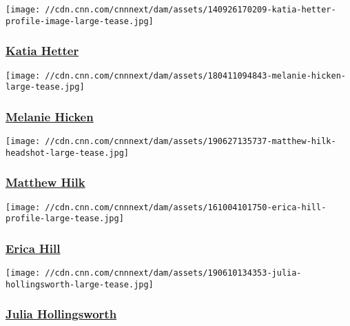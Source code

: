 \href{/profiles/katia-hetter}{}

\texttt{[image: //cdn.cnn.com/cnnnext/dam/assets/140926170209-katia-hetter-profile-image-large-tease.jpg]}

\hypertarget{katia-hetter}{%
\subsubsection{\texorpdfstring{\href{/profiles/katia-hetter}{Katia
Hetter}}{Katia Hetter}}\label{katia-hetter}}

\href{/profiles/melanie-hicken}{}

\texttt{[image: //cdn.cnn.com/cnnnext/dam/assets/180411094843-melanie-hicken-large-tease.jpg]}

\hypertarget{melanie-hicken}{%
\subsubsection{\texorpdfstring{\href{/profiles/melanie-hicken}{Melanie
Hicken}}{Melanie Hicken}}\label{melanie-hicken}}

\href{/profiles/matthew-hilk}{}

\texttt{[image: //cdn.cnn.com/cnnnext/dam/assets/190627135737-matthew-hilk-headshot-large-tease.jpg]}

\hypertarget{matthew-hilk}{%
\subsubsection{\texorpdfstring{\href{/profiles/matthew-hilk}{Matthew
Hilk}}{Matthew Hilk}}\label{matthew-hilk}}

\href{/profiles/erica-hill-profile}{}

\texttt{[image: //cdn.cnn.com/cnnnext/dam/assets/161004101750-erica-hill-profile-large-tease.jpg]}

\hypertarget{erica-hill}{%
\subsubsection{\texorpdfstring{\href{/profiles/erica-hill-profile}{Erica
Hill}}{Erica Hill}}\label{erica-hill}}

\href{/profiles/julia-hollingsworth}{}

\texttt{[image: //cdn.cnn.com/cnnnext/dam/assets/190610134353-julia-hollingsworth-large-tease.jpg]}

\hypertarget{julia-hollingsworth}{%
\subsubsection{\texorpdfstring{\href{/profiles/julia-hollingsworth}{Julia
Hollingsworth}}{Julia Hollingsworth}}\label{julia-hollingsworth}}


